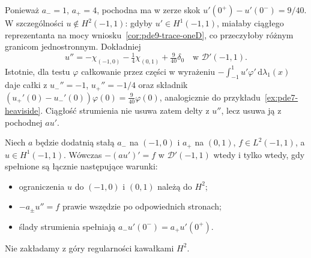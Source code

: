Ponieważ $a_-=1$, $a_+=4$, pochodna ma w zerze skok
$u'(0^+)-u'(0^-)=9/40$. W szczególności $u\notin H^2(-1,1)$:
gdyby $u'\in H^1(-1,1)$, miałaby ciągłego reprezentanta
na mocy wniosku~\ref{cor:pde9-trace-oneD}, co przeczyłoby
różnym granicom jednostronnym. Dokładniej
\[
 u''=-\chi_{(-1,0)}-\tfrac14\chi_{(0,1)}
 +\tfrac9{40}\delta_0
 \quad\text{w }\mathcal D'(-1,1).
\]
Istotnie, dla testu $\varphi$ całkowanie przez części
w wyrażeniu $-\int_{-1}^1u'\varphi'\,\mathrm d\lambda_1(x)$
daje całki z $u_-''=-1$, $u_+''=-1/4$ oraz składnik
$(u_+'(0)-u_-'(0))\varphi(0)=\tfrac9{40}\varphi(0)$,
analogicznie do przykładu~\ref{ex:pde7-heaviside}.
Ciągłość strumienia nie usuwa zatem delty z $u''$,
lecz usuwa ją z pochodnej $au'$.

\begin{stwierdzenie}
\label{prop:pde13-transmission}
Niech $a$ będzie dodatnią stałą $a_-$ na $(-1,0)$ i
$a_+$ na $(0,1)$, $f\in L^2(-1,1)$, a $u\in H^1(-1,1)$.
Wówczas $-(au')'=f$ w $\mathcal D'(-1,1)$ wtedy i tylko wtedy,
gdy spełnione są łącznie następujące warunki:
\begin{itemize}
 \item ograniczenia $u$ do $(-1,0)$ i $(0,1)$ należą do $H^2$;
 \item $-a_\pm u''=f$ prawie wszędzie po odpowiednich stronach;
 \item ślady strumienia spełniają $a_-u'(0^-)=a_+u'(0^+)$.
\end{itemize}
Nie zakładamy z góry regularności kawałkami $H^2$.
\end{stwierdzenie}
